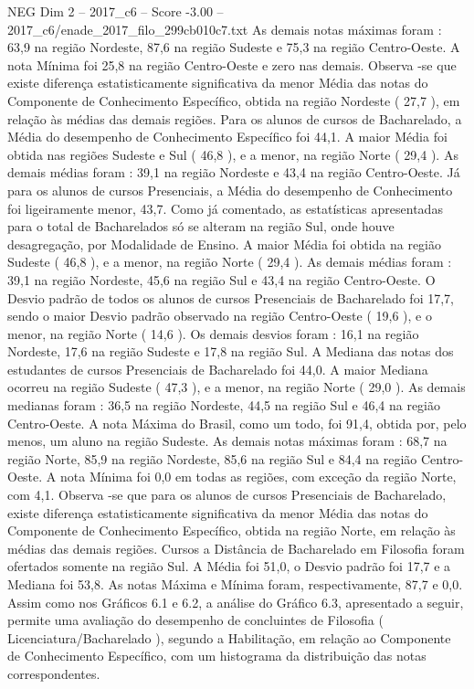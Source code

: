 \begin{textsample}{NEG Dim 2 – 2017\_c6 – Score -3.00 – 2017\_c6/enade\_2017\_filo\_299cb010c7.txt}
As demais notas máximas foram : 63,9 na região Nordeste, 87,6 na região Sudeste e 75,3 na região Centro-Oeste.
A nota Mínima foi 25,8 na região Centro-Oeste e zero nas demais.
Observa -se que existe diferença estatisticamente significativa da menor Média das notas do Componente de Conhecimento Específico, obtida na região Nordeste ( 27,7 ), em relação às médias das demais regiões.
Para os alunos de cursos de Bacharelado, a Média do desempenho de Conhecimento Específico foi 44,1.
A maior Média foi obtida nas regiões Sudeste e Sul ( 46,8 ), e a menor, na região Norte ( 29,4 ).
As demais médias foram : 39,1 na região Nordeste e 43,4 na região Centro-Oeste.
Já para os alunos de cursos Presenciais, a Média do desempenho de Conhecimento foi ligeiramente menor, 43,7.
Como já comentado, as estatísticas apresentadas para o total de Bacharelados só se alteram na região Sul, onde houve desagregação, por Modalidade de Ensino.
A maior Média foi obtida na região Sudeste ( 46,8 ), e a menor, na região Norte ( 29,4 ).
As demais médias foram : 39,1 na região Nordeste, 45,6 na região Sul e 43,4 na região Centro-Oeste.
O Desvio padrão de todos os alunos de cursos Presenciais de Bacharelado foi 17,7, sendo o maior Desvio padrão observado na região Centro-Oeste ( 19,6 ), e o menor, na região Norte ( 14,6 ).
Os demais desvios foram : 16,1 na região Nordeste, 17,6 na região Sudeste e 17,8 na região Sul.
A Mediana das notas dos estudantes de cursos Presenciais de Bacharelado foi 44,0.
A maior Mediana ocorreu na região Sudeste ( 47,3 ), e a menor, na região Norte ( 29,0 ).
As demais medianas foram : 36,5 na região Nordeste, 44,5 na região Sul e 46,4 na região Centro-Oeste.
A nota Máxima do Brasil, como um todo, foi 91,4, obtida por, pelo menos, um aluno na região Sudeste.
As demais notas máximas foram : 68,7 na região Norte, 85,9 na região Nordeste, 85,6 na região Sul e 84,4 na região Centro-Oeste.
A nota Mínima foi 0,0 em todas as regiões, com exceção da região Norte, com 4,1.
Observa -se que para os alunos de cursos Presenciais de Bacharelado, existe diferença estatisticamente significativa da menor Média das notas do Componente de Conhecimento Específico, obtida na região Norte, em relação às médias das demais regiões.
Cursos a Distância de Bacharelado em Filosofia foram ofertados somente na região Sul.
A Média foi 51,0, o Desvio padrão foi 17,7 e a Mediana foi 53,8.
As notas Máxima e Mínima foram, respectivamente, 87,7 e 0,0.
Assim como nos Gráficos 6.1 e 6.2, a análise do Gráfico 6.3, apresentado a seguir, permite uma avaliação do desempenho de concluintes de Filosofia ( Licenciatura/Bacharelado ), segundo a Habilitação, em relação ao Componente de Conhecimento Específico, com um histograma da distribuição das notas correspondentes.

\end{textsample}

